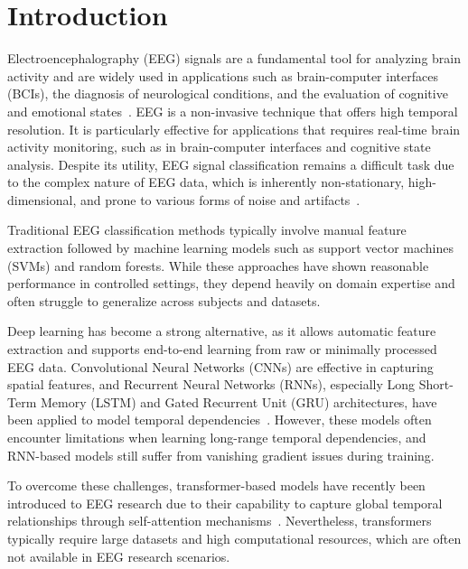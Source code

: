 \documentclass[pdflatex,sn-mathphys-num]{sn-jnl}
\theoremstyle{thmstyleone}%
\theoremstyle{thmstyletwo}%
\theoremstyle{thmstylethree}%
\begin{document}
\maketitle

\section{Introduction}\label{sec:introduction}

Electroencephalography (EEG) signals are a fundamental tool for analyzing brain activity and are widely used in applications such as brain-computer interfaces (BCIs), the diagnosis of neurological conditions, and the evaluation of cognitive and emotional states~\cite{roy2019deep}. EEG is a non-invasive technique that offers high temporal resolution. It is particularly effective for applications that requires real-time brain activity monitoring, such as in brain-computer interfaces and cognitive state analysis. Despite its utility, EEG signal classification remains a difficult task due to the complex nature of EEG data, which is inherently non-stationary, high-dimensional, and prone to various forms of noise and artifacts~\cite{lotte2018review}.

Traditional EEG classification methods typically involve manual feature extraction followed by machine learning models such as support vector machines (SVMs) and random forests. While these approaches have shown reasonable performance in controlled settings, they depend heavily on domain expertise and often struggle to generalize across subjects and datasets.

Deep learning has become a strong alternative, as it allows automatic feature extraction and supports end-to-end learning from raw or minimally processed EEG data. Convolutional Neural Networks (CNNs) are effective in capturing spatial features, and Recurrent Neural Networks (RNNs), especially Long Short-Term Memory (LSTM) and Gated Recurrent Unit (GRU) architectures, have been applied to model temporal dependencies~\cite{craik2019deep}. However, these models often encounter limitations when learning long-range temporal dependencies, and RNN-based models still suffer from vanishing gradient issues during training.

To overcome these challenges, transformer-based models have recently been introduced to EEG research due to their capability to capture global temporal relationships through self-attention mechanisms~\cite{vafaei2025transformers}. Nevertheless, transformers typically require large datasets and high computational resources, which are often not available in EEG research scenarios.
\end{document}
